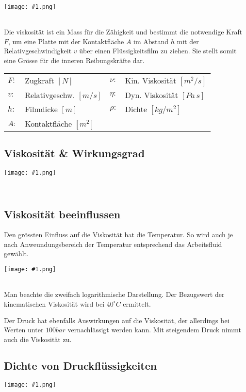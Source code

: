 \documentclass[landscape,a4paper,10pt]{article}
\newcommand{\graphicsm}[1]{
\noindent
\begin{minipage}{\columnwidth}
\centering
\texttt{[image: \#1.png]}
\end{minipage} 
\medskip 
\\
}
\newcommand{\graphiccol}[1]{
\noindent
\begin{minipage}{\columnwidth}
\centering
\texttt{[image: \#1.png]}
\end{minipage}
\medskip \\
}
\begin{document}
\begin{multicols*}{3}
\graphicsm{viskositaet}

Die viskosität ist ein Mass für die Zähigkeit und bestimmt die notwendige Kraft $F$, um eine Platte mit der Kontaktfläche $A$ im Abstand $h$ mit der Relativgeschwindigkeit $v$ über einen Flüssigkeitsfilm zu ziehen. Sie stellt somit eine Grösse für die inneren Reibungskräfte dar. 

\begin{tabular}{llll}
$F:$ & Zugkraft $[N]$ & $\nu:$ & Kin. Viskosität $[m^2/s]$ \\
$v:$ & Relativgeschw. $[m/s]$ & $\eta:$ & Dyn. Viskosität $[Pa\,s]$ \\
$h:$ & Filmdicke $[m]$ & $\rho:$ & Dichte $[kg/m^2]$\\
$A:$ & Kontaktfläche $[m^2]$
\end{tabular}


\subsection{Viskosität \& Wirkungsgrad}
\graphiccol{visk_wirkungsgrad}
\vfill


\subsection{Viskosität beeinflussen}
Den grössten Einfluss auf die Viskosität hat die Temperatur. So wird auch je nach Anweundungsbereich der Temperatur entsprechend das Arbeitsfluid gewählt. 
\graphiccol{visk_temp}
Man beachte die zweifach logarithmische Darstellung. Der Bezugswert der kinematischen Viskosität wird bei $40^\circ C$ ermittelt.

Der Druck hat ebenfalls Auswirkungen auf die Viskosität, der allerdings bei Werten unter $100 bar$ vernachlässigt werden kann. Mit steigendem Druck nimmt auch die Viskosität zu. 
\vfill

\subsection{Dichte von Druckflüssigkeiten}
\graphiccol{dichte}




\end{multicols*}
\end{document}
